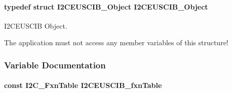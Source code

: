 \paragraph[{I2\-C\-E\-U\-S\-C\-I\-B\-\_\-\-Object}]{\setlength{\rightskip}{0pt plus 5cm}typedef struct {\bf I2\-C\-E\-U\-S\-C\-I\-B\-\_\-\-Object}  {\bf I2\-C\-E\-U\-S\-C\-I\-B\-\_\-\-Object}}\label{_i2_c_e_u_s_c_i_b_8h_ae6882d1e8a8d4484a9a78d60f02fbe4c}


I2\-C\-E\-U\-S\-C\-I\-B Object. 

The application must not access any member variables of this structure! 

\subsubsection{Variable Documentation}
\paragraph[{I2\-C\-E\-U\-S\-C\-I\-B\-\_\-fxn\-Table}]{\setlength{\rightskip}{0pt plus 5cm}const {\bf I2\-C\-\_\-\-Fxn\-Table} I2\-C\-E\-U\-S\-C\-I\-B\-\_\-fxn\-Table}\label{_i2_c_e_u_s_c_i_b_8h_aabe3af9e77a2b8cc7cd82dd22618e406}
